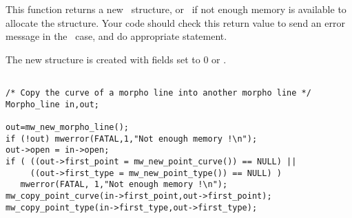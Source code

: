 \newpage %


\Description
This function returns a new \mline\ structure, or \Null\ if not enough 
memory is available to allocate the structure. 
Your code should check this return value to send an error message in the 
\Null\ case, and do appropriate statement.

The new structure is created with fields set to $0$ or \Null.

\Next
\Example
\begin{verbatim}

/* Copy the curve of a morpho line into another morpho line */
Morpho_line in,out;

out=mw_new_morpho_line();
if (!out) mwerror(FATAL,1,"Not enough memory !\n");
out->open = in->open;
if ( ((out->first_point = mw_new_point_curve()) == NULL) ||
     ((out->first_type = mw_new_point_type()) == NULL) )
   mwerror(FATAL, 1,"Not enough memory !\n");
mw_copy_point_curve(in->first_point,out->first_point);
mw_copy_point_type(in->first_type,out->first_type);

\end{verbatim}

\newpage %


